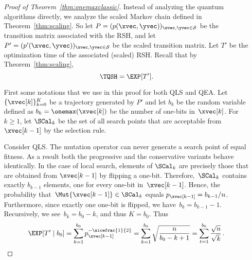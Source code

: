 \begin{proof}[Proof of Theorem~\ref{thm:onemaxclassic}]
%
%
%
%
%
%

  Instead of analyzing the quantum algorithms directly, we analyze the
  scaled Markov chain defined in Theorem~\ref{thm:scaling}. So let $P
  = (p(\xvec,\yvec))_{\xvec,\yvec\in\mathcal{S}}$ be the transition
  matrix associated with the RSH, and let $P' =
  (p'(\xvec,\yvec))_{\xvec,\yvec\in\mathcal{S}}$ be the scaled
  transition matrix. Let $T'$ be the optimization time of the
  associated (scaled) RSH. Recall that by Theorem~\ref{thm:scaling},
  \[
  \TQSH = \EXP[T'].
  \] 

  First some notations that we use in this proof for both QLS and QEA.
  Let $\{\xvec[k]\}_{k=0}^K$ be a trajectory generated by $P'$ and let
  $b_k$ be the random variable defined as $b_k= \onemax(\xvec[k])$ be
  the number of one-bits in~$\xvec[k]$. For $k\geq 1$, let $\SCal_k$
  be the set of all search points that are acceptable from
  $\xvec[k-1]$ by the selection rule.


  Consider QLS. The mutation operator can never generate a search
  point of equal fitness. As a result both the progressive and the
  conservative variants behave identically.  In the case of local
  search, elements of $\SCal_k$ are precisely those that are obtained
  from $\xvec[k-1]$ by flipping a one-bit. Therefore,~$\SCal_k$
  contains exactly $b_{k-1}$ elements, one for every one-bit
  in~$\xvec[k-1]$. Hence, the probability
  that~$\Mut{\xvec[k-1]}\in\SCal_k$ equals $p_{\xvec[k-1]} =
  b_{k-1}/n$. Furthermore, since exactly one one-bit is flipped, we
  have~$b_k=b_{k-1}-1$. Recursively, we see~$b_k =b_0-k$, and thus
  $K=b_0$. Thus
  \[
  \EXP[T' \mid b_0] =
  \sum_{k=1}^{b_0}p_{\xvec[k-1]}^{-\nicefrac{1}{2}} =
  \sum_{k=1}^{b_0}\sqrt{\frac{n}{b_0-k+1}} =
  \sum_{t=1}^{b_0}\frac{\sqrt{n}}{\sqrt{k}}\,.
  \]


\end{proof}
